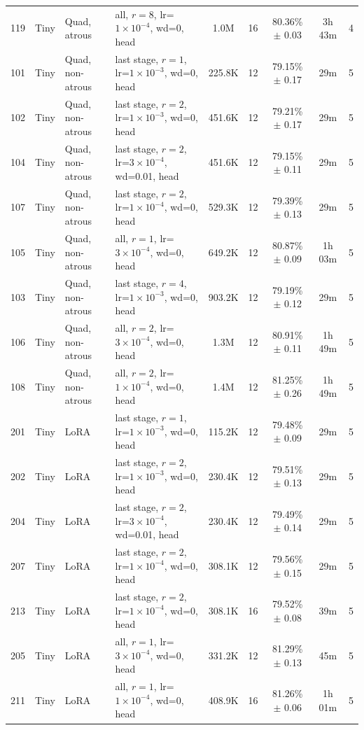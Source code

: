 \begin{longtable}{llllccccc}
119 & Tiny & Quad, atrous & all, $r=8$, lr=$1{\times}10^{-4}$, wd=0, head & 1.0M & 16 & 80.36\% $\pm$ 0.03 & 3h 43m & 4 \\
101 & Tiny & Quad, non-atrous & last stage, $r=1$, lr=$1{\times}10^{-3}$, wd=0, head & 225.8K & 12 & 79.15\% $\pm$ 0.17 & 29m & 5 \\
102 & Tiny & Quad, non-atrous & last stage, $r=2$, lr=$1{\times}10^{-3}$, wd=0, head & 451.6K & 12 & 79.21\% $\pm$ 0.17 & 29m & 5 \\
104 & Tiny & Quad, non-atrous & last stage, $r=2$, lr=$3{\times}10^{-4}$, wd=0.01, head & 451.6K & 12 & 79.15\% $\pm$ 0.11 & 29m & 5 \\
107 & Tiny & Quad, non-atrous & last stage, $r=2$, lr=$1{\times}10^{-4}$, wd=0, head & 529.3K & 12 & 79.39\% $\pm$ 0.13 & 29m & 5 \\
105 & Tiny & Quad, non-atrous & all, $r=1$, lr=$3{\times}10^{-4}$, wd=0, head & 649.2K & 12 & 80.87\% $\pm$ 0.09 & 1h 03m & 5 \\
103 & Tiny & Quad, non-atrous & last stage, $r=4$, lr=$1{\times}10^{-3}$, wd=0, head & 903.2K & 12 & 79.19\% $\pm$ 0.12 & 29m & 5 \\
106 & Tiny & Quad, non-atrous & all, $r=2$, lr=$3{\times}10^{-4}$, wd=0, head & 1.3M & 12 & 80.91\% $\pm$ 0.11 & 1h 49m & 5 \\
108 & Tiny & Quad, non-atrous & all, $r=2$, lr=$1{\times}10^{-4}$, wd=0, head & 1.4M & 12 & 81.25\% $\pm$ 0.26 & 1h 49m & 5 \\
201 & Tiny & LoRA & last stage, $r=1$, lr=$1{\times}10^{-3}$, wd=0, head & 115.2K & 12 & 79.48\% $\pm$ 0.09 & 29m & 5 \\
202 & Tiny & LoRA & last stage, $r=2$, lr=$1{\times}10^{-3}$, wd=0, head & 230.4K & 12 & 79.51\% $\pm$ 0.13 & 29m & 5 \\
204 & Tiny & LoRA & last stage, $r=2$, lr=$3{\times}10^{-4}$, wd=0.01, head & 230.4K & 12 & 79.49\% $\pm$ 0.14 & 29m & 5 \\
207 & Tiny & LoRA & last stage, $r=2$, lr=$1{\times}10^{-4}$, wd=0, head & 308.1K & 12 & 79.56\% $\pm$ 0.15 & 29m & 5 \\
213 & Tiny & LoRA & last stage, $r=2$, lr=$1{\times}10^{-4}$, wd=0, head & 308.1K & 16 & 79.52\% $\pm$ 0.08 & 39m & 5 \\
205 & Tiny & LoRA & all, $r=1$, lr=$3{\times}10^{-4}$, wd=0, head & 331.2K & 12 & 81.29\% $\pm$ 0.13 & 45m & 5 \\
211 & Tiny & LoRA & all, $r=1$, lr=$1{\times}10^{-4}$, wd=0, head & 408.9K & 16 & 81.26\% $\pm$ 0.06 & 1h 01m & 5 \\

\end{longtable}
